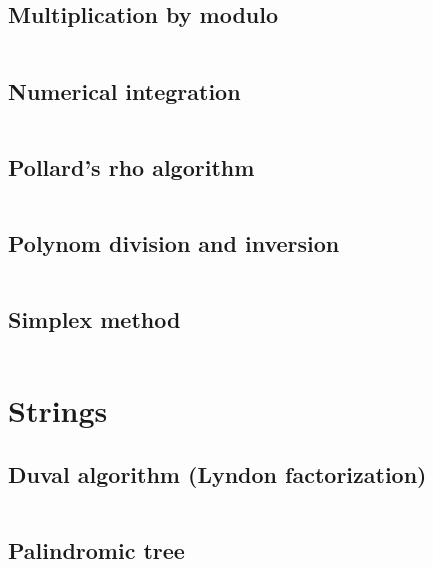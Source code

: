 \documentclass{article}
\begin{document}
\subsection{Multiplication by modulo}
\inputminted[mathescape, breaklines, breakafter=(, tabsize=2, frame=lines, showtabs, tab=|\ , tabcolor=lightgray]{c++}{./numeric/mult-by-mod/mult-by-mod.cpp}
\subsection{Numerical integration}
\inputminted[mathescape, breaklines, breakafter=(, tabsize=2, frame=lines, showtabs, tab=|\ , tabcolor=lightgray]{c++}{./numeric/numerical-integration/numerical-integration.cpp}
\subsection{Pollard's rho algorithm}
\inputminted[mathescape, breaklines, breakafter=(, tabsize=2, frame=lines, showtabs, tab=|\ , tabcolor=lightgray]{c++}{./numeric/pollard/pollard.cpp}
\subsection{Polynom division and inversion}
\inputminted[mathescape, breaklines, breakafter=(, tabsize=2, frame=lines, showtabs, tab=|\ , tabcolor=lightgray]{c++}{./numeric/polynom-division/polynom-division.cpp}
\subsection{Simplex method}
\inputminted[mathescape, breaklines, breakafter=(, tabsize=2, frame=lines, showtabs, tab=|\ , tabcolor=lightgray]{c++}{./numeric/simplex/simplex.cpp}
\section{Strings}
\subsection{Duval algorithm (Lyndon factorization)}
\inputminted[mathescape, breaklines, breakafter=(, tabsize=2, frame=lines, showtabs, tab=|\ , tabcolor=lightgray]{c++}{./strings/duval/duval.cpp}
\subsection{Palindromic tree}
\inputminted[mathescape, breaklines, breakafter=(, tabsize=2, frame=lines, showtabs, tab=|\ , tabcolor=lightgray]{c++}{./strings/eertree/eertree.cpp}
\end{document}
